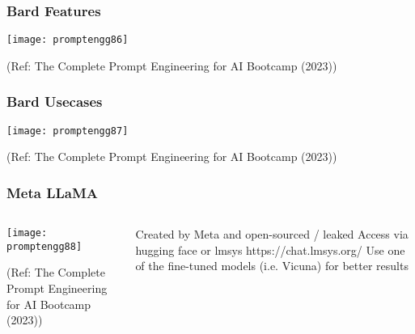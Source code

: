 \begin{frame}[fragile]\frametitle{Bard Features}


		\begin{center}
		\texttt{[image: promptengg86]}

		{\tiny (Ref: The Complete Prompt Engineering for AI Bootcamp (2023))}
		\end{center}	

\end{frame}

\begin{frame}[fragile]\frametitle{Bard Usecases}


		\begin{center}
		\texttt{[image: promptengg87]}

		{\tiny (Ref: The Complete Prompt Engineering for AI Bootcamp (2023))}
		\end{center}	

\end{frame}



\begin{frame}[fragile]\frametitle{Meta LLaMA}


\begin{columns}
    \begin{column}[T]{0.6\linewidth}
		\begin{center}
		\texttt{[image: promptengg88]}

		{\tiny (Ref: The Complete Prompt Engineering for AI Bootcamp (2023))}
		\end{center}	
    \end{column}
    \begin{column}[T]{0.4\linewidth}
		Created by Meta and open-sourced / leaked
		Access via hugging face or lmsys https://chat.lmsys.org/
		Use one of the fine-tuned models (i.e. Vicuna) for better results
    \end{column}
  \end{columns}
\end{frame}


